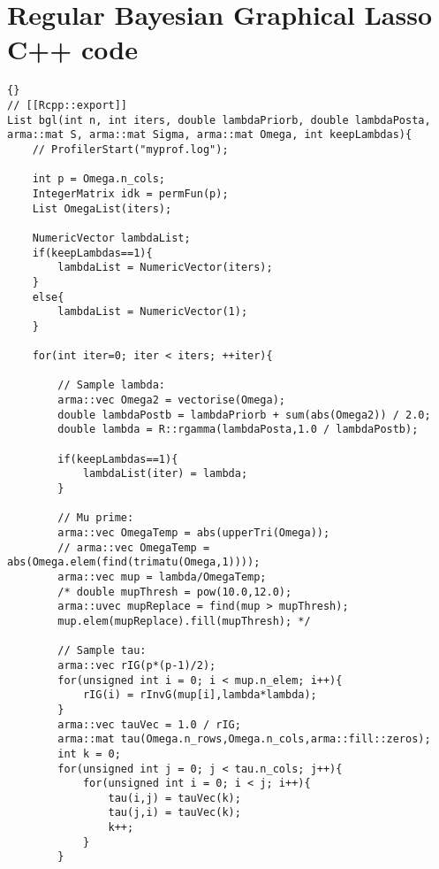 \section{Regular Bayesian Graphical Lasso C++ code}
\begin{lstlisting}{}
// [[Rcpp::export]]
List bgl(int n, int iters, double lambdaPriorb, double lambdaPosta,
arma::mat S, arma::mat Sigma, arma::mat Omega, int keepLambdas){
	// ProfilerStart("myprof.log");
	
	int p = Omega.n_cols;
	IntegerMatrix idk = permFun(p);
	List OmegaList(iters);
	
	NumericVector lambdaList;
	if(keepLambdas==1){
		lambdaList = NumericVector(iters);
	}
	else{
		lambdaList = NumericVector(1);
	}
	
	for(int iter=0; iter < iters; ++iter){
		
		// Sample lambda:
		arma::vec Omega2 = vectorise(Omega);
		double lambdaPostb = lambdaPriorb + sum(abs(Omega2)) / 2.0;
		double lambda = R::rgamma(lambdaPosta,1.0 / lambdaPostb);
		
		if(keepLambdas==1){
			lambdaList(iter) = lambda;
		}
		
		// Mu prime:
		arma::vec OmegaTemp = abs(upperTri(Omega));
		// arma::vec OmegaTemp = abs(Omega.elem(find(trimatu(Omega,1))));
		arma::vec mup = lambda/OmegaTemp;
		/* double mupThresh = pow(10.0,12.0);
		arma::uvec mupReplace = find(mup > mupThresh);
		mup.elem(mupReplace).fill(mupThresh); */
		
		// Sample tau:
		arma::vec rIG(p*(p-1)/2);
		for(unsigned int i = 0; i < mup.n_elem; i++){
			rIG(i) = rInvG(mup[i],lambda*lambda);
		}
		arma::vec tauVec = 1.0 / rIG;
		arma::mat tau(Omega.n_rows,Omega.n_cols,arma::fill::zeros);
		int k = 0;
		for(unsigned int j = 0; j < tau.n_cols; j++){
			for(unsigned int i = 0; i < j; i++){
				tau(i,j) = tauVec(k);
				tau(j,i) = tauVec(k);
				k++;
			}
		}
		

\end{lstlisting}
